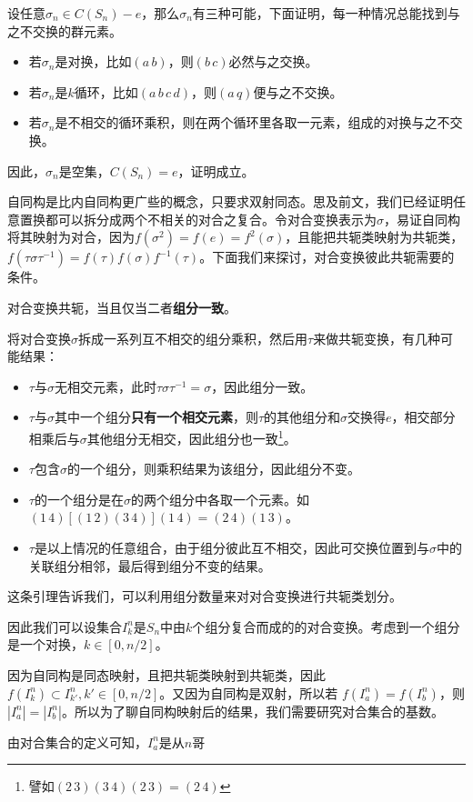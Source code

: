 设任意$\sigma_n\in C(S_n)-e$，那么$\sigma_n$有三种可能，下面证明，每一种情况总能找到与之不交换的群元素。

\begin{itemize}
\item 若$\sigma_n$是对换，比如$(a\,b)$，则$(b\,c)$必然与之交换。
\item 若$\sigma_n$是$k$循环，比如$(a\,b\,c\,d)$，则$(a\,q)$便与之不交换。
\item 若$\sigma_n$是不相交的循环乘积，则在两个循环里各取一元素，组成的对换与之不交换。
\end{itemize}
因此，$\sigma_n$是空集，$C(S_n)=e$，证明成立。

自同构是比内自同构更广些的概念，只要求双射同态。思及前文，我们已经证明任意置换都可以拆分成两个不相关的对合之复合。令对合变换表示为$\sigma$，易证自同构将其映射为对合，因为$f(\sigma^2)=f(e)=f^2(\sigma)$，且能把共轭类映射为共轭类，$f(\tau\sigma\tau^{-1})=f(\tau)f(\sigma)f^{-1}(\tau)$。下面我们来探讨，对合变换彼此共轭需要的条件。


\begin{lemma}{}
对合变换共轭，当且仅当二者\textbf{组分一致}。
\end{lemma}
将对合变换$\sigma$拆成一系列互不相交的组分乘积，然后用$\tau$来做共轭变换，有几种可能结果：
\begin{itemize}
\item $\tau$与$\sigma$无相交元素，此时$\tau\sigma\tau^{-1}=\sigma$，因此组分一致。
\item $\tau$与$\sigma$其中一个组分\textbf{只有一个相交元素}，则$\tau$的其他组分和$\sigma$交换得$e$，相交部分相乘后与$\sigma$其他组分无相交，因此组分也一致\footnote{譬如$(2\,3)(3\,4)(2\,3)=(2\,4)$}。
\item $\tau$包含$\sigma$的一个组分，则乘积结果为该组分，因此组分不变。
\item $\tau$的一个组分是在$\sigma$的两个组分中各取一个元素。如$(1\,4)[(1\,2)(3\,4)](1\,4)=(2\,4)(1\,3)$。
\item $\tau$是以上情况的任意组合，由于组分彼此互不相交，因此可交换位置到与$\sigma$中的关联组分相邻，最后得到组分不变的结果。
\end{itemize}

这条引理告诉我们，可以利用组分数量来对对合变换进行共轭类划分。

因此我们可以设集合$I_k^n$是$S_n$中由$k$个组分复合而成的的对合变换。考虑到一个组分是一个对换，$k\in[0,n/2]$。

因为自同构是同态映射，且把共轭类映射到共轭类，因此$f(I_k^n)\subset I_{k'}^n,k'\in [0,n/2]$。又因为自同构是双射，所以若 $f(I_a^n)=f(I_b^n)$，则$|I_a^n|=|I_b^n|$。所以为了聊自同构映射后的结果，我们需要研究对合集合的基数。

由对合集合的定义可知，$I_a^n$是从$n$哥